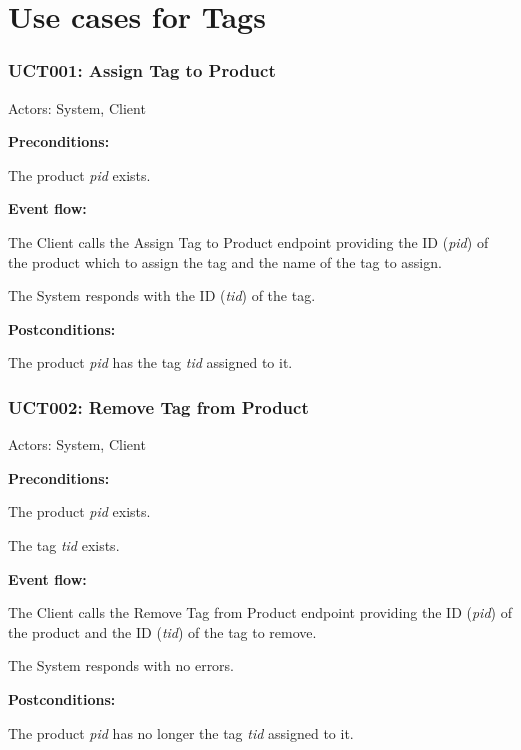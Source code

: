 \section{Use cases for Tags}

\begin{ucbox}{\subsubsection{UCT001: Assign Tag to Product}}
\label{UCT001}

Actors: System, Client

\textbf{Preconditions:}

\ucitem The product \textit{pid} exists.

\textbf{Event flow:}

\ucitem The Client calls the Assign Tag to Product endpoint providing the ID (\textit{pid}) of the product which to assign the tag and the name of the tag to assign.

\ucitem The System responds with the ID (\textit{tid}) of the tag.

\textbf{Postconditions:}

\ucitem The product \textit{pid} has the tag \textit{tid} assigned to it.

\end{ucbox}

\begin{ucbox}{\subsubsection{UCT002: Remove Tag from Product}}
\label{UCT002}

Actors: System, Client

\textbf{Preconditions:}

\ucitem The product \textit{pid} exists.

\ucitem The tag \textit{tid} exists.

\textbf{Event flow:}

\ucitem The Client calls the Remove Tag from Product endpoint providing the ID (\textit{pid}) of the product and the ID (\textit{tid}) of the tag to remove.

\ucitem The System responds with no errors.

\textbf{Postconditions:}

\ucitem The product \textit{pid} has no longer the tag \textit{tid} assigned to it.

\end{ucbox}

